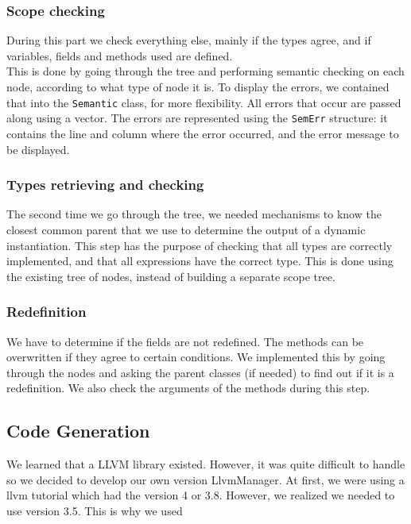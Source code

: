 \documentclass[a4paper,11pt]{article}
\begin{document}
	\subsubsection{Scope checking}
	During this part we check everything else, mainly if the types agree, and if variables, fields and methods used are defined.\\
	This is done by going through the tree and performing semantic checking on each node, according to what type of node it is. To display the errors, we contained that into the \texttt{Semantic} class, for more flexibility. All errors that occur are passed along using a vector. The errors are represented using the \texttt{SemErr} structure: it contains the line and column where the error occurred, and the error message to be displayed.
      
  \subsubsection{Types retrieving and checking}
    The second time we go through the tree, we needed mechanisms to know the closest common parent that we use to determine the output 
    of a dynamic instantiation. 
    This step has the purpose of checking that all types are correctly implemented, and that all expressions have the correct type. This is done using the existing tree of nodes, instead of building a separate scope tree.

  \subsubsection{Redefinition}
    We have to determine if the  fields are not redefined. 
    The methods can be overwritten if they agree to certain conditions. We implemented this by going through the nodes
    and asking the parent classes (if needed) to find out if it is a redefinition.
    We also check the arguments of the methods during this step.



\subsection{Code Generation}
  \label{sec:codeGeneration}

  We learned that a LLVM library existed. However, it was quite difficult to handle so we decided to develop 
  our own version LlvmManager. At first, we were using a llvm tutorial which had the version 4 or 3.8. 
  However, we realized we needed to use version 3.5. This is why we used 
\end{document}
